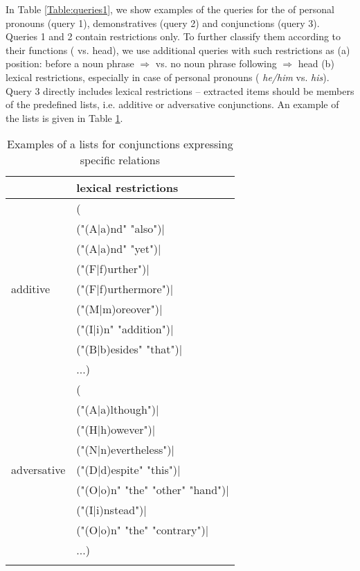 \documentclass[output=paper]{langsci/langscibook.cls}
\begin{document}
In Table \ref{Table:queries1}, we show examples of the queries for the  of personal pronouns (query 1), demonstratives (query 2) and conjunctions (query 3). Queries 1 and 2 contain  restrictions only. To further classify them according to their functions ( vs. head), we use additional queries with such restrictions as (a) position: before a noun phrase $\Rightarrow$  vs. no noun phrase following $\Rightarrow$ head (b) lexical restrictions, especially in case of personal pronouns ( \textsl{he/him} vs.  \textsl{his}). Query 3 directly includes lexical restrictions -- extracted items should be members of the predefined lists, i.e. additive or adversative conjunctions. An example of the lists is given in Table \ref{Table:conjlist}.

\begin{table}
	
	
	\begin{tabular}{ll}
		\lsptoprule
		&\bf	lexical restrictions \\
		\midrule
		&(\\
		&("(A$|$a)nd" "also")$|$\\
		&("(A$|$a)nd" "yet")$|$\\
		&("(F$|$f)urther")$|$\\
		additive&("(F$|$f)urthermore")$|$\\
		&("(M$|$m)oreover")$|$\\
		&("(I$|$i)n" "addition")$|$\\
		&("(B$|$b)esides" "that")$|$\\
		&...)\\
		\midrule
		&(\\
		&	("(A$|$a)lthough")$|$\\
		&	("(H$|$h)owever")$|$\\
		&	("(N$|$n)evertheless")$|$\\
		adversative	&	("(D$|$d)espite" "this")$|$\\
		&	("(O$|$o)n" "the" "other" "hand")$|$\\
		&	("(I$|$i)nstead")$|$\\
		&	("(O$|$o)n" "the" "contrary")$|$\\
		&...)\\
		\lspbottomrule
	\end{tabular}
	\caption{Examples of a lists for conjunctions expressing specific relations}
	\label{Table:conjlist}
\end{table}
\end{document}
